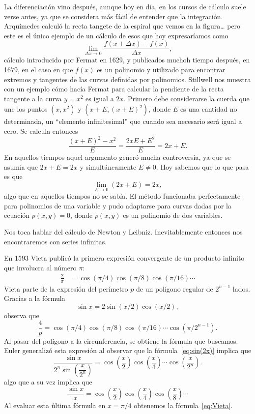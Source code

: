 La diferenciación vino después, aunque hoy en día, en los cursos de cálculo
suele verse antes, ya que se considera más fácil de entender que la
integración.  Arquímedes calculó la recta tangete de la espiral que vemos en la
figura\dots{} pero este es el único ejemplo de un cálculo de
esos que hoy expresaríamos como
\[
	\lim_{\Delta x\to 0}\frac{f(x+\Delta x)-f(x)}{\Delta x},
\]
cálculo introducido por Fermat en 1629, y publicados muchoh tiempo después, en
1679, en el caso en que $f(x)$ es un polinomio y utilizado para encontrar
extremos y tangentes de las curvas definidas por polinomios. Stillwell nos
muestra con un ejemplo cómo hacía Fermat para calcular la pendiente de la recta
tangente a la curva $y=x^2$ es igual a $2x$. Primero debe considerarse la
cuerda que une los puntos $(x,x^2)$ y $(x+E,(x+E)^2)$, donde $E$ es una
cantidad no determinada, un ``elemento infinitesimal'' que cuando sea necesario
será igual a cero. 
Se calcula entonces
\[
	\frac{(x+E)^2-x^2}{E}=\frac{2xE+E^2}{E}=2x+E.
\]
En aquellos tiempos aquel argumento generó mucha controversia, ya que se asumía que
$2x+E=2x$ y simultáneamente $E\ne 0$. Hoy sabemos que lo que pasa es que 
\[
	\lim_{E\to 0}(2x+E)=2x,
\]
algo que en aquellos tiempos no se sabía. El método funcionaba perfectamente
para polinomios de una variable y pudo adaptarse para curvas dadas por la
ecuación $p(x,y)=0$, donde $p(x,y)$ es un polinomio de dos variables. 

Nos toca hablar del cálculo de Newton y Leibniz. Inevitablemente entonces nos encontraremos 
con series infinitas. 

En 1593 Vieta publicó la primera expresión convergente de un producto
infinito que involucra al número $\pi$:
\begin{align}
	\label{eq:Vieta}
	\frac{2}{\pi}&=\cos(\pi/4)\cos(\pi/8)\cos(\pi/16)\cdots
\end{align}
Vieta parte de la expresión
del perímetro $p$ de un polígono regular de $2^{n-1}$ lados.  Gracias
a la fórmula 
\begin{equation}
	\label{eq:sin(2x)}
	\sin x=2\sin(x/2)\cos(x/2), 
\end{equation}
observa que
\[
	\frac{4}{p}=\cos(\pi/4)\cos(\pi/8)\cos(\pi/16)\cdots\cos(\pi/2^{n-1}).
\]
Al pasar del polígono a la circunferencia, se obtiene la fórmula que buscamos.
Euler generalizó esta expresión al observar que la fórmula~\eqref{eq:sin(2x)}
implica que 
\[
	\dfrac{\sin x}{2^n\sin\left(\dfrac{x}{2^n}\right)}
	=\cos\left(\dfrac{x}{2}\right)\cos\left(\dfrac{x}{4}\right)\cdots\cos\left(\dfrac{x}{2^n}\right).
\]
algo que a su vez implica que 
\[
	\frac{\sin x}{x}
	=\cos\left(\dfrac{x}{2}\right)\cos\left(\dfrac{x}{4}\right) \cos\left(\dfrac{x}{8}\right)\cdots
\]
Al evaluar esta última fórmula en $x=\pi/4$ obtenemos la fórmula~\eqref{eq:Vieta}. 

